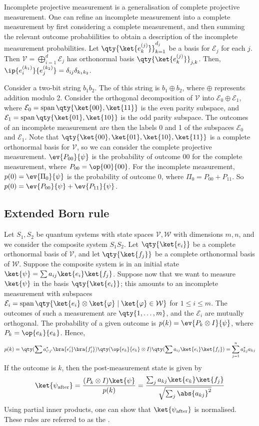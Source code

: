 Incomplete projective measurement is a generalisation of complete projective measurement.
One can refine an incomplete measurement into a complete measurement by first considering a complete measurement, and then summing the relevant outcome probabiilities to obtain a description of the incomplete measurement probabilities.
Let $\qty{\ket{e_k^{(j)}}}_{k=1}^{d_j}$ be a basis for $\mathcal E_j$ for each $j$.
Then $\mathcal V = \bigoplus_{i=1}^d \mathcal E_j$ has orthonormal basis $\qty{\ket{e_k^{(j)}}}_{j,k}$.
Then, $\ip{e_i^{(k_1)}}{e_j^{(k_2)}} = \delta_{ij} \delta_{k_1 k_2}$.

Consider a two-bit string $b_1 b_2$.
The  of this string is $b_1 \oplus b_2$, where $\oplus$ represents addition modulo 2.
Consider the orthogonal decomposition of $\mathcal V$ into $\mathcal E_0 \oplus \mathcal E_1$, where $\mathcal E_0 = \vecspan \qty{\ket{00}, \ket{11}}$ is the even parity subspace, and $\mathcal E_1 = \vecspan \qty{\ket{01}, \ket{10}}$ is the odd parity subspace.
The outcomes of an incomplete measurement are then the labels 0 and 1 of the subspaces $\mathcal E_0$ and $\mathcal E_1$.
Note that $\qty{\ket{00}, \ket{01}, \ket{10}, \ket{11}}$ is a complete orthonormal basis for $\mathcal V$, so we can consider the complete projective measurement.
$\ev{P_{00}}{\psi}$ is the probability of outcome $00$ for the complete measurement, where $P_{00} = \op{00}{00}$.
For the incomplete measurement, $p(0) = \ev{\Pi_0}{\psi}$ is the probability of outcome 0, where $\Pi_0 = P_{00} + P_{11}$.
So $p(0) = \ev{P_{00}}{\psi} + \ev{P_{11}}{\psi}$.

\subsection{Extended Born rule}
Let $S_1, S_2$ be quantum systems with state spaces $\mathcal V, \mathcal W$ with dimensions $m, n$, and we consider the composite system $S_1 S_2$.
Let $\qty{\ket{e_i}}$ be a complete orthonormal basis of $\mathcal V$, and let $\qty{\ket{f_j}}$ be a complete orthonormal basis of $\mathcal W$.
Suppose the composite system is in an initial state $\ket{\psi} = \sum a_{ij} \ket{e_i} \ket{f_j}$.
Suppose now that we want to measure $\ket{\psi}$ in the basis $\qty{\ket{e_i}}$; this amounts to an incomplete measurement with subspaces $\mathcal E_i = \vecspan \qty{\ket{e_i} \otimes \ket{\varphi} \mid \ket{\varphi} \in \mathcal W}$ for $1 \leq i \leq m$.
The outcomes of such a measurement are $\qty{1, \dots, m}$, and the $\mathcal E_i$ are mutually orthogonal.
The probability of a given outcome is $p(k) = \ev{P_k \otimes I}{\psi}$, where $P_k = \op{e_k}{e_k}$.
Hence,
\[ p(k) = \qty(\sum a_{i'j'}^\star \bra{e_i'} \bra{f_j'}) \qty(\op{e_k}{e_k} \otimes I) \qty(\sum a_{ij} \ket{e_i} \ket{f_j}) = \sum_{j=1}^n a_{kj}^\star a_{kj} \]
If the outcome is $k$, then the post-measurement state is given by
\[ \ket{\psi_{\text{after}}} = \frac{(P_k \otimes I)\ket{\psi}}{p(k)} = \frac{\sum_j a_{kj} \ket{e_k} \ket{f_j}}{\sqrt{\sum_j \abs{a_{kj}}^2}} \]
Using partial inner products, one can show that $\ket{\psi_{\text{after}}}$ is normalised.
These rules are referred to as the .

